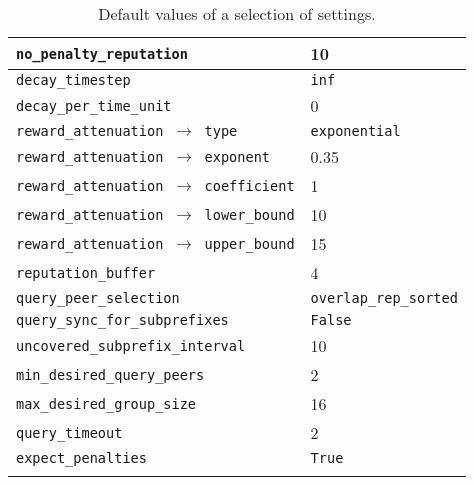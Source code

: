 \begin{longtable}{|l|l|}
\hline
\cellcolor{slightgray}\T \texttt{no\_penalty\_reputation} & 10 \B\\
\hline
\cellcolor{slightgray}\T \texttt{decay\_timestep} & \texttt{inf} \B\\%
\hline
\cellcolor{slightgray}\T \texttt{decay\_per\_time\_unit} & 0 \B\\%
\hline
\cellcolor{slightgray}\T \texttt{reward\_attenuation $\rightarrow$ type} & \texttt{exponential} \B\\
\hline
\cellcolor{slightgray}\T \texttt{reward\_attenuation $\rightarrow$ exponent} & 0.35 \B\\
\hline
\cellcolor{slightgray}\T \texttt{reward\_attenuation $\rightarrow$ coefficient} & 1 \B\\
\hline
\cellcolor{slightgray}\T \texttt{reward\_attenuation $\rightarrow$ lower\_bound} & 10 \B\\
\hline
\cellcolor{slightgray}\T \texttt{reward\_attenuation $\rightarrow$ upper\_bound} & 15 \B\\
\hline
\cellcolor{slightgray}\T \texttt{reputation\_buffer} & 4 \B\\
\hline
\cellcolor{slightgray}\T \texttt{query\_peer\_selection} & \texttt{overlap\_rep\_sorted} \B\\
\hline
\cellcolor{slightgray}\T \texttt{query\_sync\_for\_subprefixes} & \texttt{False} \B\\
\hline
\cellcolor{slightgray}\T \texttt{uncovered\_subprefix\_interval} & 10 \B\\
\hline
\cellcolor{slightgray}\T \texttt{min\_desired\_query\_peers} & 2 \B\\
\hline
\cellcolor{slightgray}\T \texttt{max\_desired\_group\_size} & 16 \B\\
\hline
\cellcolor{slightgray}\T \texttt{query\_timeout} & 2 \B\\
\hline
\cellcolor{slightgray}\T \texttt{expect\_penalties} & \texttt{True} \B\\
\hline
\caption{Default values of a selection of settings.}
\label{tab:default_settings}
\end{longtable}

